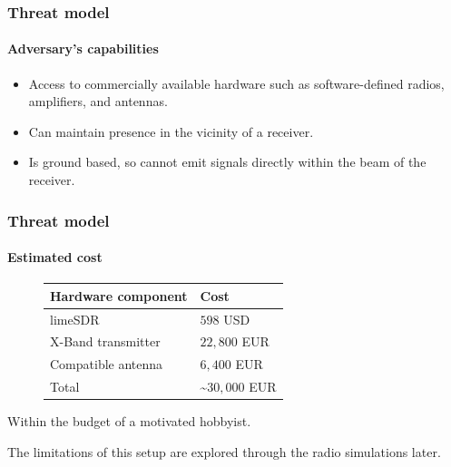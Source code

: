 \documentclass{beamer}
\begin{document}
\begin{frame}
  \frametitle{Threat model}
  \framesubtitle{Adversary's capabilities}
  \begin{itemize}
    \item Access to commercially available hardware such as software-defined radios, amplifiers, and antennas.
    \item Can maintain presence in the vicinity of a receiver.
    \item Is ground based, so cannot emit signals directly within the beam of the receiver.
  \end{itemize}
\end{frame}

\begin{frame}
  \frametitle{Threat model}
  \framesubtitle{Estimated cost}

  \begin{figure}
      \centering
      \begin{tabular}{ l | l }
        \textbf{Hardware component} & \textbf{Cost} \\
        \hline
        limeSDR & $598$ USD \\
        X-Band transmitter & $22,800$ EUR \\
        Compatible antenna & $6,400$ EUR \\
        \hline
        Total & \~{}$30,000$ EUR
      \end{tabular}
      \label{tab:cost}
  \end{figure}

  Within the budget of a motivated hobbyist.

  The limitations of this setup are explored through the radio simulations later.
\end{frame}



\end{document}
